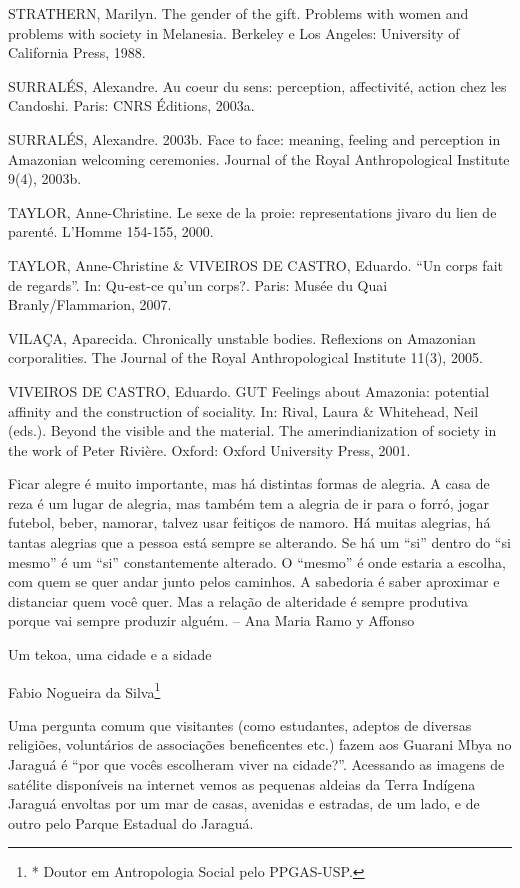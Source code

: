 \documentclass{article}
\begin{document}
STRATHERN, Marilyn. The gender of the gift. Problems with women and
problems with society in Melanesia. Berkeley e Los Angeles: University
of California Press, 1988.

SURRAL\'ES, Alexandre. Au coeur du sens: perception, affectivit\'e,
action chez les Candoshi. Paris: CNRS \'Editions, 2003a.

SURRAL\'ES, Alexandre. 2003b. Face to face: meaning, feeling and
perception in Amazonian welcoming ceremonies. Journal of the Royal
Anthropological Institute 9(4), 2003b.

TAYLOR, Anne-Christine. Le sexe de la proie: representations jivaro du
lien de parent\'e. L{\textquoteright}Homme 154-155, 2000.

TAYLOR, Anne-Christine \& VIVEIROS DE CASTRO, Eduardo.
{\textquotedblleft}Un corps fait de regards{\textquotedblright}. In:
Qu-est-ce qu{\textquoteright}un corps?. Paris: Mus\'ee du Quai
Branly/Flammarion, 2007.

VILA\c{C}A, Aparecida. Chronically unstable bodies. Reflexions on
Amazonian corporalities. The Journal of the Royal Anthropological
Institute 11(3), 2005.

VIVEIROS DE CASTRO, Eduardo. GUT Feelings about Amazonia: potential
affinity and the construction of sociality. In: Rival, Laura \&
Whitehead, Neil (eds.). Beyond the visible and the material. The
amerindianization of society in the work of Peter Rivi\`ere. Oxford:
Oxford University Press, 2001.

Ficar alegre \'e muito importante, mas h\'a distintas formas de alegria.
A casa de reza \'e um lugar de alegria, mas tamb\'em tem a alegria de
ir para o forr\'o, jogar futebol, beber, namorar, talvez usar
feiti\c{c}os de namoro. H\'a muitas alegrias, h\'a tantas alegrias que
a pessoa est\'a sempre se alterando. Se h\'a um
{\textquotedblleft}si{\textquotedblright} dentro do
{\textquotedblleft}si mesmo{\textquotedblright} \'e um
{\textquotedblleft}si{\textquotedblright} constantemente alterado. O
{\textquotedblleft}mesmo{\textquotedblright} \'e onde estaria a
escolha, com quem se quer andar junto pelos caminhos. A sabedoria \'e
saber aproximar e distanciar quem voc\^e quer. Mas a rela\c{c}\~ao de
alteridade \'e sempre produtiva porque vai sempre produzir algu\'em. --
Ana Maria Ramo y Affonso

Um tekoa, uma cidade e a sidade

Fabio Nogueira da Silva\footnote{* Doutor em Antropologia Social pelo
PPGAS-USP.}

Uma pergunta comum que visitantes (como estudantes, adeptos de diversas
religi\~oes, volunt\'arios de associa\c{c}\~oes beneficentes etc.)
fazem aos Guarani Mbya no Jaragu\'a \'e {\textquotedblleft}por que
voc\^es escolheram viver na cidade?{\textquotedblright}. Acessando as
imagens de sat\'elite dispon\'iveis na internet vemos as pequenas
aldeias da Terra Ind\'igena Jaragu\'a envoltas por um mar de casas,
avenidas e estradas, de um lado, e de outro pelo Parque Estadual do
Jaragu\'a. 
\end{document}
